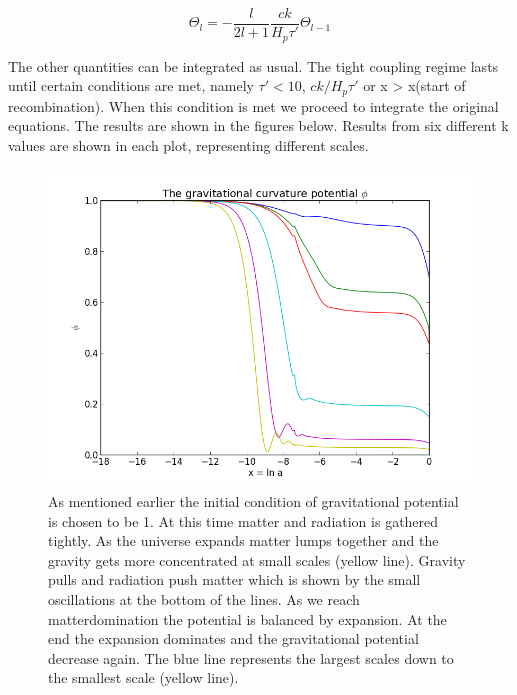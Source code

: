 \documentclass[norsk,a4paper,12pt]{article}
\begin{document}
\begin{equation}
 \Theta_l = -\frac{l}{2l + 1}\frac{ck}{H_p\tau'}\Theta_{l-1}
\end{equation}

The other quantities can be integrated as usual. The tight coupling regime lasts until certain conditions are met, namely $\tau' < 10$, $ck/H_p\tau'$ or x > x(start of recombination). When this condition is met we proceed to integrate the original equations. The results are shown in the figures below. Results from six different k values are shown in each plot, representing different scales. 

\begin{figure}[H] 
\begin{center} 
\includegraphics[scale=0.5]{phi.png} 
 

\caption{As mentioned earlier the initial condition of gravitational potential is chosen to be 1. At this time matter and radiation is gathered tightly. As the universe expands matter lumps together and the gravity gets more concentrated at small scales (yellow line). Gravity pulls and radiation push matter which is shown by the small oscillations at the bottom of the lines. As we reach matterdomination the potential is balanced by expansion. At the end the expansion dominates and the gravitational potential decrease again. The blue line represents the largest scales down to the smallest scale (yellow line). } 
\end{center} 
\end{figure}
\end{document}
